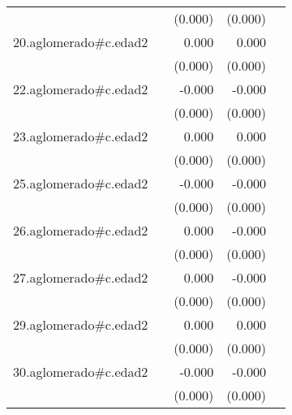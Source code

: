 {\begin{longtable}{l*{4}{D{.}{.}{-1}}}
            &                     &     (0.000)         &     (0.000)         &                     \\
\addlinespace
20.aglomerado#c.edad2&                     &       0.000         &       0.000         &                     \\
            &                     &     (0.000)         &     (0.000)         &                     \\
\addlinespace
22.aglomerado#c.edad2&                     &      -0.000\sym{*}  &      -0.000\sym{***}&                     \\
            &                     &     (0.000)         &     (0.000)         &                     \\
\addlinespace
23.aglomerado#c.edad2&                     &       0.000         &       0.000         &                     \\
            &                     &     (0.000)         &     (0.000)         &                     \\
\addlinespace
25.aglomerado#c.edad2&                     &      -0.000         &      -0.000         &                     \\
            &                     &     (0.000)         &     (0.000)         &                     \\
\addlinespace
26.aglomerado#c.edad2&                     &       0.000         &      -0.000         &                     \\
            &                     &     (0.000)         &     (0.000)         &                     \\
\addlinespace
27.aglomerado#c.edad2&                     &       0.000         &      -0.000         &                     \\
            &                     &     (0.000)         &     (0.000)         &                     \\
\addlinespace
29.aglomerado#c.edad2&                     &       0.000         &       0.000         &                     \\
            &                     &     (0.000)         &     (0.000)         &                     \\
\addlinespace
30.aglomerado#c.edad2&                     &      -0.000         &      -0.000         &                     \\
            &                     &     (0.000)         &     (0.000)         &                     \\

\end{longtable}}
